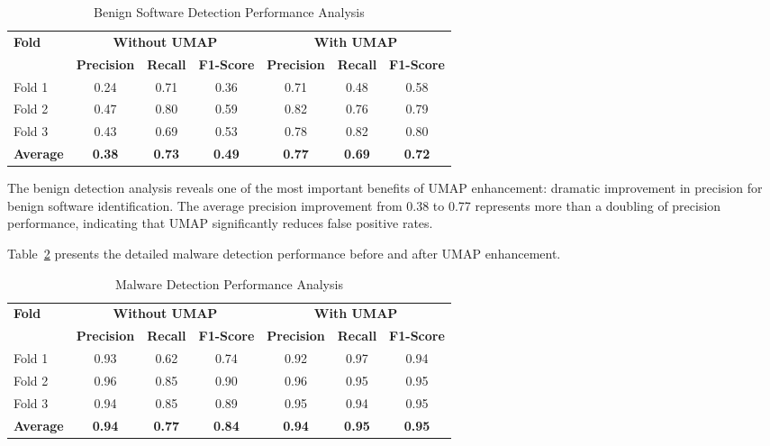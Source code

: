 \begin{table}[!htbp]
\centering
\caption{Benign Software Detection Performance Analysis}
\label{tab:benign-detection-performance}
\setlength{\tabcolsep}{4pt}
\begin{tabular}{|l|c|c|c|c|c|c|}
\hline
\multirow{2}{*}{\textbf{Fold}} & \multicolumn{3}{c|}{\textbf{Without UMAP}} & \multicolumn{3}{c|}{\textbf{With UMAP}} \\
\cline{2-7}
& \textbf{Precision} & \textbf{Recall} & \textbf{F1-Score} & \textbf{Precision} & \textbf{Recall} & \textbf{F1-Score} \\
\hline
Fold 1 & 0.24 & 0.71 & 0.36 & 0.71 & 0.48 & 0.58 \\
Fold 2 & 0.47 & 0.80 & 0.59 & 0.82 & 0.76 & 0.79 \\
Fold 3 & 0.43 & 0.69 & 0.53 & 0.78 & 0.82 & 0.80 \\
\hline
\textbf{Average} & \textbf{0.38} & \textbf{0.73} & \textbf{0.49} & \textbf{0.77} & \textbf{0.69} & \textbf{0.72} \\
\hline
\end{tabular}
\end{table}

The benign detection analysis reveals one of the most important benefits of UMAP enhancement: dramatic improvement in precision for benign software identification. The average precision improvement from 0.38 to 0.77 represents more than a doubling of precision performance, indicating that UMAP significantly reduces false positive rates.

Table~\ref{tab:malware-detection-performance} presents the detailed malware detection performance before and after UMAP enhancement.

\begin{table}[!htbp]
\centering
\caption{Malware Detection Performance Analysis}
\label{tab:malware-detection-performance}
\setlength{\tabcolsep}{4pt}
\begin{tabular}{|l|c|c|c|c|c|c|}
\hline
\multirow{2}{*}{\textbf{Fold}} & \multicolumn{3}{c|}{\textbf{Without UMAP}} & \multicolumn{3}{c|}{\textbf{With UMAP}} \\
\cline{2-7}
& \textbf{Precision} & \textbf{Recall} & \textbf{F1-Score} & \textbf{Precision} & \textbf{Recall} & \textbf{F1-Score} \\
\hline
Fold 1 & 0.93 & 0.62 & 0.74 & 0.92 & 0.97 & 0.94 \\
Fold 2 & 0.96 & 0.85 & 0.90 & 0.96 & 0.95 & 0.95 \\
Fold 3 & 0.94 & 0.85 & 0.89 & 0.95 & 0.94 & 0.95 \\
\hline
\textbf{Average} & \textbf{0.94} & \textbf{0.77} & \textbf{0.84} & \textbf{0.94} & \textbf{0.95} & \textbf{0.95} \\
\hline
\end{tabular}
\end{table}

